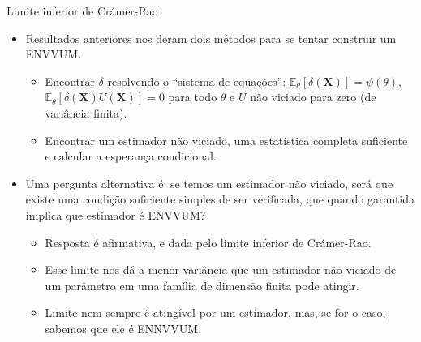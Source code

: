 \documentclass[11pt]{beamer}
\begin{document}
			\begin{frame}{Limite inferior de Crámer-Rao}
		\begin{itemize}
			\item Resultados anteriores nos deram dois métodos para se tentar construir um ENVVUM.
			\begin{itemize}
				\item Encontrar $\delta$ resolvendo o ``sistema de equações'': $\mathbb{E}_\theta[\delta(\boldsymbol{X})]=\psi(\theta)$, $\mathbb{E}_\theta[\delta(\boldsymbol{X}) U(\boldsymbol{X})] = 0$ para todo $\theta$ e $U$ não viciado para zero (de variância finita).
				\item Encontrar um estimador não viciado, uma estatística completa suficiente e calcular a esperança condicional.
			\end{itemize}
			\item Uma pergunta alternativa é: se temos um estimador não viciado, será que existe uma condição {\color{blue}suficiente} simples de ser verificada, que quando garantida implica que estimador é ENVVUM?
			\begin{itemize}
				\item Resposta é afirmativa, e dada pelo limite inferior de Crámer-Rao.
				\item Esse limite nos dá a menor variância que um estimador não viciado de um parâmetro em uma família de dimensão finita pode atingir.
				\item Limite nem sempre é atingível por um estimador, mas, se for o caso, sabemos que ele é ENNVVUM.
			\end{itemize}
		\end{itemize}
	\end{frame}
\end{document}
